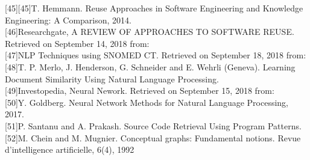 \documentclass[a4paper]{article}
\begin{document}
[45][45]T. Hemmann. Reuse Approaches in Software Engineering and
Knowledge Engineering: A Comparison, 2014. \\
[46][46]Researchgate, A REVIEW OF APPROACHES TO SOFTWARE REUSE. Retrieved on September 14, 2018 from: \href{https://www.researchgate.net/publication/263926582/download/}\\
[47][47]NLP Techniques using SNOMED CT. Retrieved on September 18, 2018 from: \href{https://confluence.ihtsdotools.org/display/DOCANLYT/5.1+Natural+Language+Processing/}\\
[48][48]T. P. Merlo, J. Henderson, G. Schneider and E. Wehrli (Geneva). Learning Document Similarity
Using Natural Language Processing. \\
[49][49]Investopedia, Neural Nework. Retrieved on September 15, 2018 from: \href{https://www.investopedia.com/terms/n/neuralnetwork.asp}\\
[50][50]Y. Goldberg. Neural Network Methods for Natural Language Processing, 2017. \\
[51][51]P. Santanu and A. Prakash.  Source Code Retrieval Using Program Patterns. \\
[52][52]M. Chein and M. Mugnier. Conceptual graphs: Fundamental notions. Revue d’intelligence artificielle, 6(4), 1992
\end{document}
